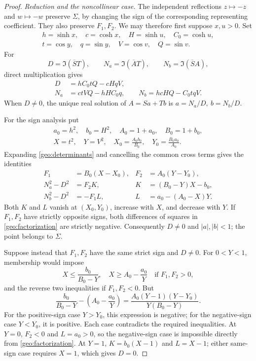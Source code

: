 \documentclass[11pt]{article}
\numberwithin{equation}{section}
\theoremstyle{definition}
\begin{document}
\begin{proof}
\emph{Reduction and the noncollinear case.}
The independent reflections \(z\mapsto-z\) and \(w\mapsto-w\)
preserve \(\Sigma\), by changing the sign of the corresponding
representing coefficient.  They also preserve \(F_1,F_2\).
We may therefore first suppose \(x,u>0\).  Set
\[
 \begin{gathered}
 h=\sinh x,\quad c=\cosh x,\quad H=\sinh u,\quad C_0=\cosh u,\\
 t=\cos y,\quad q=\sin y,\quad V=\cos v,\quad Q=\sin v.
 \end{gathered}
\]
For
\[
 D=\Im(\overline S T),\qquad
 N_a=\Im(\overline A T),\qquad N_b=\Im(\overline S A),
\]
direct multiplication gives
\begin{align}
 D&=hC_0tQ-cHqV,\nonumber\\
 N_a&=ctVQ-hHC_0q,\qquad
 N_b=hcHQ-C_0tqV. \label{geo:determinants}
\end{align}
When \(D\ne0\), the unique real solution of \(A=Sa+Tb\) is
\(a=N_a/D,\ b=N_b/D\).

For the sign analysis put
\[
 \begin{gathered}
 a_0=h^2,\quad b_0=H^2,\quad A_0=1+a_0,\quad B_0=1+b_0,\\
 X=t^2,\quad Y=V^2,\quad
 X_0=\frac{A_0b_0}{B_0},\quad Y_0=\frac{B_0a_0}{A_0}.
 \end{gathered}
\]
Expanding \eqref{geo:determinants} and cancelling the common cross
terms gives the identities
\begin{align}
 F_1&=B_0(X-X_0),& F_2&=A_0(Y-Y_0),\nonumber\\
 N_a^2-D^2&=F_2K,&K&=(B_0-Y)X-b_0,\label{geo:factorization}\\
 N_b^2-D^2&=-F_1L,&L&=a_0-(A_0-X)Y.\nonumber
\end{align}
Both \(K\) and \(L\) vanish at \((X_0,Y_0)\), increase with
\(X\), and decrease with \(Y\).  If \(F_1,F_2\) have strictly
opposite signs, both differences of squares in
\eqref{geo:factorization} are strictly negative.  Consequently
\(D\ne0\) and \(|a|,|b|<1\); the point belongs to \(\Sigma\).

Suppose instead that \(F_1,F_2\) have the same strict sign and
\(D\ne0\).  For \(0<Y<1\), membership would impose
\[
 X\leq\frac{b_0}{B_0-Y},\quad
 X\geq A_0-\frac{a_0}{Y}
 \quad\text{if }F_1,F_2>0,
\]
and the reverse two inequalities if \(F_1,F_2<0\).  But
\begin{equation}\label{geo:threshold-difference}
 \frac{b_0}{B_0-Y}-\left(A_0-\frac{a_0}{Y}\right)
 =\frac{A_0(Y-1)(Y-Y_0)}{Y(B_0-Y)}.
\end{equation}
For the positive-sign case \(Y>Y_0\), this expression is negative;
for the negative-sign case \(Y<Y_0\), it is positive.  Each case
contradicts the required inequalities.  At \(Y=0\), \(F_2<0\)
and \(L=a_0>0\), so the negative-sign case is impossible directly
from \eqref{geo:factorization}.  At \(Y=1\),
\(K=b_0(X-1)\) and \(L=X-1\); either same-sign case requires
\(X=1\), which gives \(D=0\).


\end{proof}
\end{document}
